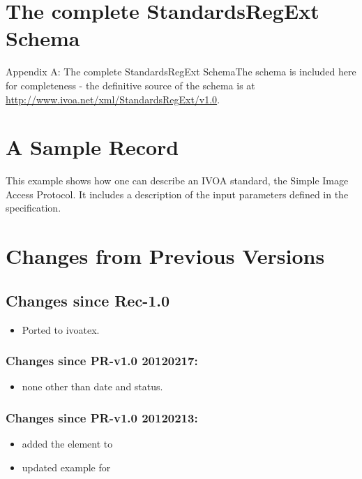 \documentclass[11pt,a4paper]{ivoa}
\begin{document}
\section{The complete StandardsRegExt Schema}

Appendix A: The complete StandardsRegExt SchemaThe schema is included
here for completeness - the definitive source of the schema is at
\href{http://www.ivoa.net/xml/StandardsRegExt/v1.0}{http://www.ivoa.net/xml/StandardsRegExt/v1.0}.



\section{A Sample Record}

This example shows how one can describe an IVOA standard, the Simple
Image Access Protocol.  It includes a description of the input parameters
defined in the specification.  



\section{Changes from Previous Versions}

\subsection{Changes since Rec-1.0}

\begin{itemize}
\item Ported to ivoatex.
\end{itemize}

\subsubsection{Changes since PR-v1.0 20120217:}

\begin{itemize}
\item  none other than date and status.
\end{itemize}

\subsubsection{Changes since PR-v1.0 20120213:}

\begin{itemize}
\item  added the  element to

\item  updated example for 

\end{itemize}
\end{document}
